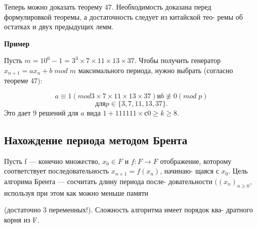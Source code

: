 \documentclass{../template/mai_book}
\begin{document}
{\begin{myproof}
\end{myproof}
Теперь можно доказать теорему 47. Необходимость доказана перед \linebreak формулировкой теоремы, а достаточность следует из китайской тео- \linebreak ремы об остатках и двух предыдущих лемм. \par 
\textbf{Пример} \par
Пусть $m = 10^{6} - 1 = 3^{3} \times 7 \times 11 \times 13 \times 37$. Чтобы получить генератор \linebreak $x_{n+1} = ax_{n} + b \; mod \; m$  максимального периода, нужно выбрать (согласно \linebreak теореме 47): \par 
$$a \equiv 1 (mod 3 \times 7 \times 11 \times 13 \times 37) и b \not\equiv 0 (mod \; p)$$
$$для p \in \{3, 7, 11, 13, 37\}.$$
\noindent Это дает 9 решений для $a$ вида $1 + 111111 \times с 0 \geqslant k \geqslant 8.$
\subsection{Нахождение периода методом Брента}
\noindent Пусть f --- конечно множество, $x_{0} \in F$ и $f: F \to F$ отображение, которому соответствует последовательность $x_{n+1} = f(x_{n})$, начинаю- \linebreak щаяся с $x_{0}$. Цель алгорима Брента --- сосчитать длину периода после- \linebreak довательности $((x_{n})_{n \geqslant 0}$, используя при этом как можно меньше памяти \linebreak


\noindent(достаточно 3 переменных!). Сложность алгоритма имеет порядок ква- \linebreak дратного корня из F.} \par 
\end{document}
